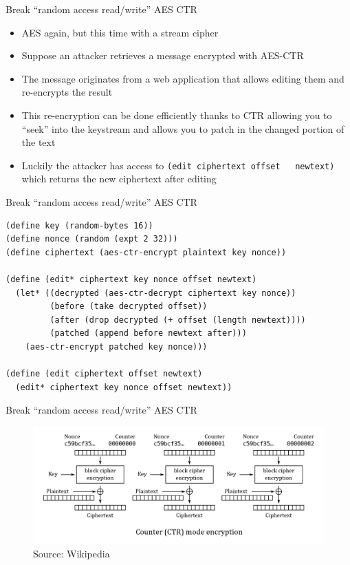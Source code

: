 \documentclass[presentation]{beamer}
\begin{document}
\begin{frame}[fragile,label=sec-2-22]{Break “random access read/write” AES CTR}
 \begin{itemize}
\item AES again, but this time with a stream cipher
\item Suppose an attacker retrieves a message encrypted with AES-CTR
\item The message originates from a web application that allows editing
them and re-encrypts the result
\item This re-encryption can be done efficiently thanks to CTR allowing
you to “seek” into the keystream and allows you to patch in the
changed portion of the text
\item Luckily the attacker has access to \verb~(edit ciphertext offset   newtext)~ which returns the new ciphertext after editing
\end{itemize}
\end{frame}

\begin{frame}[fragile,label=sec-2-23]{Break “random access read/write” AES CTR}
 \begin{verbatim}
(define key (random-bytes 16))
(define nonce (random (expt 2 32)))
(define ciphertext (aes-ctr-encrypt plaintext key nonce))

(define (edit* ciphertext key nonce offset newtext)
  (let* ((decrypted (aes-ctr-decrypt ciphertext key nonce))
         (before (take decrypted offset))
         (after (drop decrypted (+ offset (length newtext))))
         (patched (append before newtext after)))
    (aes-ctr-encrypt patched key nonce)))

(define (edit ciphertext offset newtext)
  (edit* ciphertext key nonce offset newtext))
\end{verbatim}
\end{frame}

\begin{frame}[label=sec-2-24]{Break “random access read/write” AES CTR}
\begin{figure}[htb]
\centering
\includegraphics[width=.9\linewidth]{./img/ctr_encryption.png}
\caption{Source: Wikipedia}
\end{figure}
\end{frame}
\end{document}
